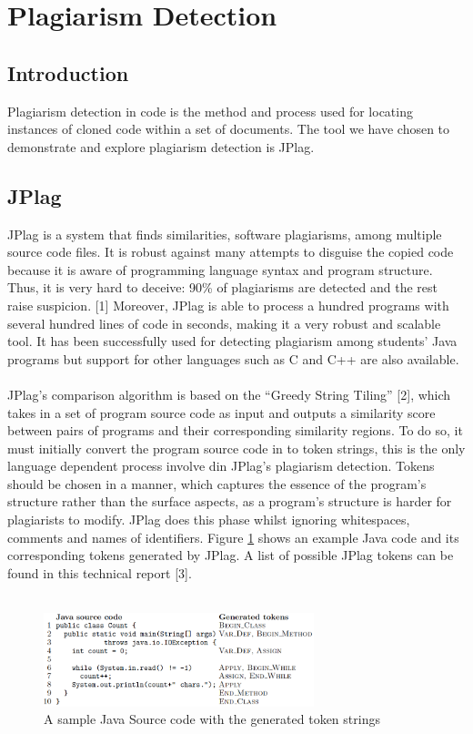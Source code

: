 \section{Plagiarism Detection}

\subsection{Introduction}
Plagiarism detection in code is the method and process used for locating instances of cloned code within a set of documents. The tool we have chosen to demonstrate and explore plagiarism detection is JPlag. 

\subsection{JPlag}
JPlag is a system that finds similarities, software plagiarisms, among multiple source code files. It is robust against many attempts to disguise the copied code because it is aware of programming language syntax and program structure. Thus, it is very hard to deceive: 90\% of plagiarisms are detected and the rest raise suspicion. [1] Moreover, JPlag is able to process a hundred programs with several hundred lines of code in seconds, making it a very robust and scalable tool. 
It has been successfully used for detecting plagiarism among students’ Java programs but support for other languages such as C and C++ are also available.\\\\
JPlag’s comparison algorithm is based on the “Greedy String Tiling” [2], which takes in a set of program source code as input and outputs a similarity score between pairs of programs and their corresponding similarity regions. To do so, it must initially convert the program source code in to token strings, this is the only language dependent process involve din JPlag’s plagiarism detection. Tokens should be chosen in a manner, which captures the essence of the program’s structure rather than the surface aspects, as a program’s structure is harder for plagiarists to modify. JPlag does this phase whilst ignoring whitespaces, comments and names of identifiers. Figure \ref{fig:sample} shows an example Java code and its corresponding tokens generated by JPlag. A list of possible JPlag tokens can be found in this technical report [3].\\\\
\begin{figure} [ht]
\centering
\includegraphics[width=0.7\textwidth]{Figures/samplecode}
\caption{A sample Java Source code with the generated token strings}
\label{fig:sample}
\end{figure}

